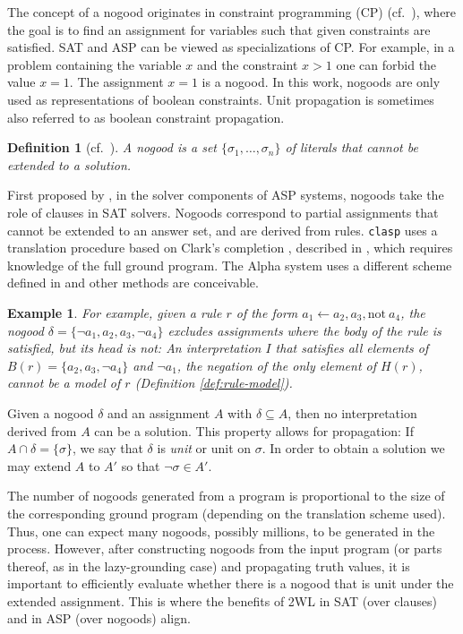 \documentclass{vutinfth} %
\newtheorem{example}{Example}[chapter]
\newtheorem{definition}{Definition}[chapter]
\newcommand{\ass}{A}
\newcommand{\headf}{H}
\newcommand{\bodyf}{B}
\newcommand{\fail}{\mathrm{not } \ \xspace}
\newcommand{\from}{\ensuremath{\leftarrow}}
\newcommand{\bsgl}{\sigma}
\newcommand{\clasp}{\texttt{clasp}\xspace}
\begin{document}
The concept of a nogood originates in constraint programming (CP) (cf.~\cite{clasp,handbook-cp,handbook-kr-cp}), where the goal is to find an assignment for variables such that given constraints are satisfied. SAT and ASP can be viewed as specializations of CP. For example, in a problem containing the variable $x$ and the constraint $x > 1$ one can forbid the value $x = 1$. The assignment $x = 1$ is a nogood. In this work, nogoods are only used as representations of boolean constraints. Unit propagation is sometimes also referred to as boolean constraint propagation.

\begin{definition}[cf.~\cite{handbook-cp}]
\label{def:nogood}
A \emph{nogood} is a set $\{ \bsgl_1, \ldots, \bsgl_n \}$ of literals that cannot be extended to a solution.
\end{definition}

First proposed by \citet{clasp-first}, in the solver components of ASP systems, nogoods take the role of clauses in SAT solvers. Nogoods correspond to partial assignments that cannot be extended to an answer set, and are derived from rules. \clasp uses a translation procedure based on Clark's completion \cite{clark}, described in \cite[Section 3]{clasp}, which requires knowledge of the full ground program. The Alpha system uses a different scheme defined in \cite[Definition 5]{blend} and other methods are conceivable.

\begin{example}
\label{ex:rule-to-nogood}
For example, given a rule $r$ of the form $a_1 \from a_2, a_3, \fail a_4$, the nogood $\delta = \{\neg a_1, a_2, a_3, \neg a_4 \}$ excludes assignments where the body of the rule is satisfied, but its head is not: An interpretation $I$ that satisfies all elements of $\bodyf(r) = \{a_2, a_3, \neg a_4 \}$ and $\neg a_1$, the negation of the only element of $\headf(r)$, cannot be a model of $r$ (Definition \ref{def:rule-model}).
\end{example}

Given a nogood $\delta$ and an assignment $\ass$ with $\delta \subseteq \ass$, then no interpretation derived from $\ass$ can be a solution. This property allows for propagation: If $\ass \cap \delta = \{ \bsgl \}$, we say that $\delta$ is \emph{unit} or unit on $\bsgl$. In order to obtain a solution we may extend $\ass$ to $\ass'$ so that $\neg \bsgl \in \ass'$.

The number of nogoods generated from a program is proportional to the size of the corresponding ground program (depending on the translation scheme used). Thus, one can expect many nogoods, possibly millions, to be generated in the process. However, after constructing nogoods from the input program (or parts thereof, as in the lazy-grounding case) and propagating truth values, it is important to efficiently evaluate whether there is a nogood that is unit under the extended assignment. This is where the benefits of 2WL in SAT (over clauses) and in ASP (over nogoods) align.
\end{document}
